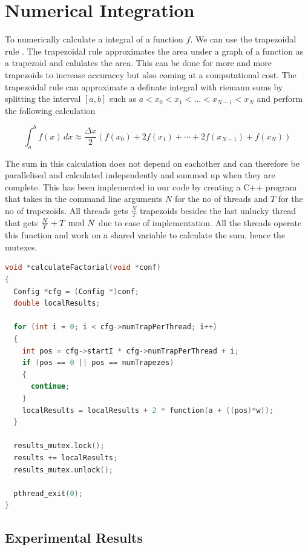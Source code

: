 \section{Numerical Integration}

To numerically calculate a integral of a function $f$. We can
use the trapezoidal rule \cite{trapezoidal}. The trapezoidal rule 
approximates the area under a graph of a function as a trapezoid and 
calulates the area. This can be done for more and more trapezoids to increase
accuraccy but also coming at a computational cost. The trapezoidal rule can 
approximate a definate integral with riemann sums by splitting the interval 
$[a, b]$ such as $a < x_0 < x_1 < \dots < x_{N-1} < x_N$ and perform the 
following calculation

\begin{equation}
    \int_a^b f(x) \, dx \approx \frac{\Delta x}{2} \left(f(x_0) + 2f(x_1) + \cdots + 2f(x_{N-1}) + f(x_N)\right)
\end{equation}

The sum in this calculation does not depend on eachother and can therefore be
parallelised and calculated independently and summed up when they are complete.
This has been implemented in our code by creating a C++ program that takes in
the command line arguments $N$ for the no of threads and $T$ for the no of
trapezoids. All threads gets $\frac{N}{T}$ trapezoids besides the last unlucky
thread that gets $\frac{N}{T} + T \ \mathrm{mod}\ N$ due to ease of implementation. All
the threads operate this function and work on a shared variable to calculate 
the sum, hence the mutexes.

\begin{lstlisting}[language=C++, caption=non-determinism.cpp]
void *calculateFactorial(void *conf)
{
  Config *cfg = (Config *)conf;
  double localResults;

  for (int i = 0; i < cfg->numTrapPerThread; i++)
  {
    int pos = cfg->startI * cfg->numTrapPerThread + i;
    if (pos == 0 || pos == numTrapezes)
    {
      continue;
    }
    localResults = localResults + 2 * function(a + ((pos)*w));
  }

  results_mutex.lock();
  results += localResults;
  results_mutex.unlock();

  pthread_exit(0);
}
\end{lstlisting}

\subsection{Experimental Results}

